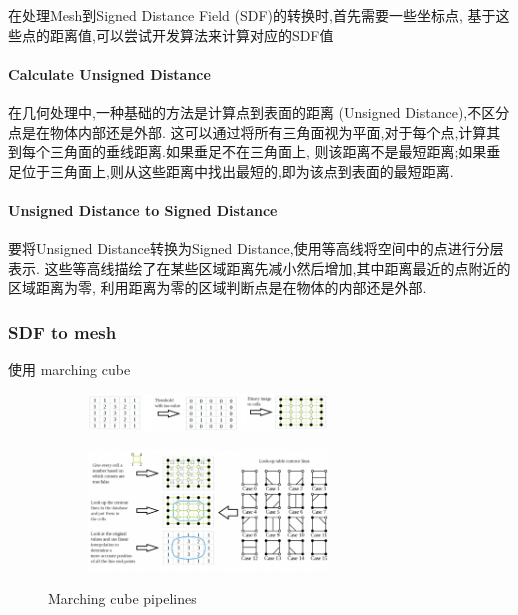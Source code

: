 在处理Mesh到Signed Distance Field (SDF)的转换时,首先需要一些坐标点,
基于这些点的距离值,可以尝试开发算法来计算对应的SDF值

\paragraph{Calculate Unsigned Distance}
在几何处理中,一种基础的方法是计算点到表面的距离 (Unsigned Distance),不区分点是在物体内部还是外部.
这可以通过将所有三角面视为平面,对于每个点,计算其到每个三角面的垂线距离.如果垂足不在三角面上,
则该距离不是最短距离;如果垂足位于三角面上,则从这些距离中找出最短的,即为该点到表面的最短距离.

\paragraph{Unsigned Distance to Signed Distance}
要将Unsigned Distance转换为Signed Distance,使用等高线将空间中的点进行分层表示.
这些等高线描绘了在某些区域距离先减小然后增加,其中距离最近的点附近的区域距离为零,
利用距离为零的区域判断点是在物体的内部还是外部.

\subsubsection{SDF to mesh}

使用 marching cube

\begin{figure}[H]
    \centering
    \begin{subfigure}
        \centering
        \includegraphics[width=0.7\textwidth]{figures/marching_cube1.png}
    \end{subfigure}
    \vspace{1em} %
    \begin{subfigure}
        \centering
        \includegraphics[width=0.7\textwidth]{figures/marching_cube2.png}
    \end{subfigure}
    \caption{Marching cube pipelines}
    \label{fig:marching_cube}
\end{figure}

